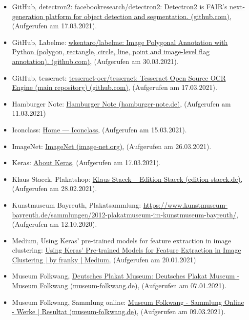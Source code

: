 \documentclass[a4paper,12pt,ngerman]{article}
\begin{document}
\begin{itemize}
\item GitHub, detectron2: \href{https://github.com/facebookresearch/detectron2}{facebookresearch/detectron2: Detectron2 is FAIR's next-generation platform for object detection and segmentation. (github.com)}, (Aufgerufen am 17.03.2021).
\item GitHub, Labelme: \href{https://github.com/wkentaro/labelme}{wkentaro/labelme: Image Polygonal Annotation with Python (polygon, rectangle, circle, line, point and image-level flag annotation). (github.com)}, (Aufgerufen am 30.03.2021).
\item GitHub, tesseract: \href{https://github.com/tesseract-ocr/tesseract}{tesseract-ocr/tesseract: Tesseract Open Source OCR Engine (main repository) (github.com)}, (Aufgerufen am 17.03.2021).
\item Hamburger Note: \href{http://hamburger-note.de/}{Hamburger Note (hamburger-note.de)}, (Aufgerufen am 11.03.2021)
\item Iconclass: \href{http://www.iconclass.nl/}{Home — Iconclass}, (Aufgerufen am 15.03.2021).
\item ImageNet: \href{http://image-net.org/about}{ImageNet (image-net.org)}, (Aufgerufen am 26.03.2021).
\item Keras: \href{https://keras.io/about/}{About Keras}, (Aufgerufen am 17.03.2021).
\item Klaus Staeck, Plakatshop: \href{https://www.edition-staeck.de/kuenstler/klaus-staeck/?art=plakat}{Klaus Staeck – Edition Staeck (edition-staeck.de)}, (Aufgerufen am 28.02.2021).
\item Kunstmuseum Bayreuth, Plakatsammlung: \href{https://www.kunstmuseum-bayreuth.de/sammlungen/2012-plakatmuseum-im-kunstmuseum-bayreuth/}{https://www.kunstmuseum-bayreuth.de/sammlungen/2012-plakatmuseum-im-kunstmuseum-bayreuth/}, (Aufgerufen am 12.10.2020).
\item Medium, Using Keras' pre-trained models for feature extraction in image clustering: \href{https://franky07724-57962.medium.com/using-keras-pre-trained-models-for-feature-extraction-in-image-clustering-a142c6cdf5b1}{Using Keras’ Pre-trained Models for Feature Extraction in Image Clustering | by franky | Medium}, (Aufgerufen am 20.01.2021)
\item Museum Folkwang, \href{https://www.museum-folkwang.de/de/ueber-uns/sammlung/deutsches-plakat-museum.html}{Deutsches Plakat Museum: Deutsches Plakat Museum - Museum Folkwang (museum-folkwang.de)}, (Aufgerufen am 07.01.2021).
\item Museum Folkwang, Sammlung online: \href{http://sammlung-online.museum-folkwang.de/eMP/eMuseumPlus?service=RedirectService\&sp=Scollection\&sp=SfieldValue\&sp=0\&sp=3\&sp=3\&sp=SsimpleList\&sp=0\&sp=Sdetail\&sp=1\&sp=F}{Museum Folkwang - Sammlung Online - Werke | Resultat (museum-folkwang.de)}, (Aufgerufen am 09.03.2021).

\end{itemize}
\end{document}
